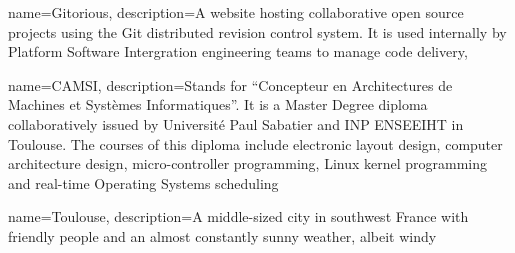 {
  name=Gitorious,
  description={A website hosting collaborative open source projects
    using the Git distributed revision control system. It is used
    internally by Platform Software Intergration engineering teams to
    manage code delivery},
}


{
  name=CAMSI,
  description={Stands for ``Concepteur en Architectures de Machines et
    Systèmes Informatiques''. It is a Master Degree diploma
    collaboratively issued by Université Paul Sabatier and INP
    ENSEEIHT in Toulouse. The courses of this diploma include
    electronic layout design, computer architecture design,
    micro-controller programming, Linux kernel programming and
    real-time Operating Systems scheduling}
}


{
  name=Toulouse,
  description={A middle-sized city in southwest France with friendly
    people and an almost constantly sunny weather, albeit windy}
}

